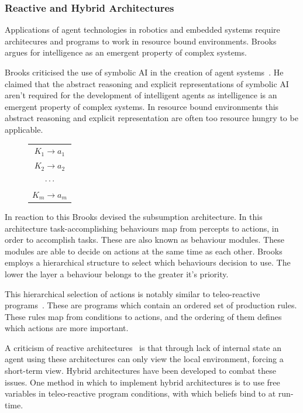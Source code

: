 \documentclass[]{final_report}
\begin{document}
\subsubsection{Reactive and Hybrid Architectures}
Applications of agent technologies in robotics and embedded systems require architecures and programs to work in resource bound environments. Brooks~\cite{brooks1991intelligence} argues for intelligence as an emergent property of complex systems.\par
Brooks criticised the use of symbolic AI in the creation of agent systems~\cite{brooks1991intelligence}. He claimed that the abstract reasoning and explicit representations of symbolic AI aren't required for the development of intelligent agents as intelligence is an emergent property of complex systems. In resource bound environments this abstract reasoning and explicit representation are often too resource hungry to be applicable.\par
\begin{figure}
\vspace{-30pt}
\begin{framed}
	\begin{center}
		\begin{tabular}{c}
		$K_1 \rightarrow a_1$\\
		$K_2 \rightarrow a_2$\\
		$\cdot \cdot \cdot$\\
		$K_m \rightarrow a_m$
		\end{tabular}
		\label{tab:trrules}
	\end{center}	
\end{framed}
\vspace{-30pt}
\end{figure}
In reaction to this Brooks devised the subsumption architecture. In this architecture task-accomplishing behaviours map from percepts to actions, in order to accomplish tasks. These are also known as behaviour modules. These modules are able to decide on actions at the same time as each other. Brooks employs a hierarchical structure to select which behaviours decision to use. The lower the layer a behaviour belongs to the greater it's priority.\par 
This hierarchical selection of actions is notably similar to teleo-reactive programs~\cite{nilsson1993teleo}. These are programs which contain an ordered set of production rules. These rules map from conditions to actions, and the ordering of them defines which actions are more important.\par 
A criticism of reactive architectures~\cite{wooldridge2009introduction} is that through lack of internal state an agent using these architectures can only view the local environment, forcing a short-term view. Hybrid architectures have been developed to combat these issues. One method in which to implement hybrid architectures is to use free variables in teleo-reactive program conditions, with which beliefs bind to at run-time.
\end{document}
